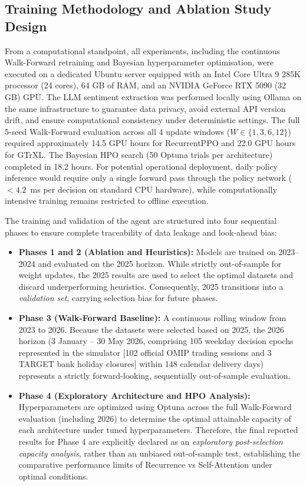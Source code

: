 \subsection{Training Methodology and Ablation Study Design}
\label{subsec:training}

From a computational standpoint, all experiments, including the continuous Walk-Forward retraining and Bayesian hyperparameter optimisation, were executed on a dedicated Ubuntu server equipped with an Intel Core Ultra 9 285K processor (24 cores), 64 GB of RAM, and an NVIDIA GeForce RTX 5090 (32 GB) GPU. The LLM sentiment extraction was performed locally using Ollama on the same infrastructure to guarantee data privacy, avoid external API version drift, and ensure computational consistency under deterministic settings. The full 5-seed Walk-Forward evaluation across all 4 update windows ($W \in \{1, 3, 6, 12\}$) required approximately 14.5 GPU hours for RecurrentPPO and 22.0 GPU hours for GTrXL. The Bayesian HPO search (50 Optuna trials per architecture) completed in 18.2 hours. For potential operational deployment, daily policy inference would require only a single forward pass through the policy network ($< 4.2$~ms per decision on standard CPU hardware), while computationally intensive training remains restricted to offline execution.

The training and validation of the agent are structured into four sequential phases to ensure complete traceability of data leakage and look-ahead bias:
\begin{itemize}
    \item \textbf{Phases 1 and 2 (Ablation and Heuristics):} Models are trained on 2023--2024 and evaluated on the 2025 horizon. While strictly out-of-sample for weight updates, the 2025 results are used to select the optimal datasets and discard underperforming heuristics. Consequently, 2025 transitions into a \textit{validation set}, carrying selection bias for future phases.
    \item \textbf{Phase 3 (Walk-Forward Baseline):} A continuous rolling window from 2023 to 2026. Because the datasets were selected based on 2025, the 2026 horizon (3 January -- 30 May 2026, comprising 105 weekday decision epochs represented in the simulator [102 official OMIP trading sessions and 3 TARGET bank holiday closures] within 148 calendar delivery days) represents a strictly forward-looking, sequentially out-of-sample evaluation.
    \item \textbf{Phase 4 (Exploratory Architecture and HPO Analysis):} Hyperparameters are optimized using Optuna across the full Walk-Forward evaluation (including 2026) to determine the optimal attainable capacity of each architecture under tuned hyperparameters. Therefore, the final reported results for Phase 4 are explicitly declared as an \textit{exploratory post-selection capacity analysis}, rather than an unbiased out-of-sample test, establishing the comparative performance limits of Recurrence vs Self-Attention under optimal conditions.
\end{itemize}

